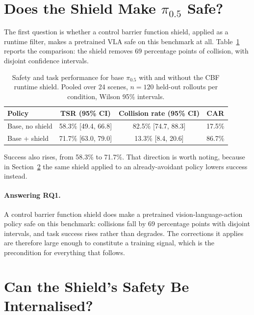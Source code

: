 \section{Does the Shield Make \texorpdfstring{$\pi_{0.5}$}{pi 0.5} Safe?}\label{sec:shield_efficacy}

The first question is whether a control barrier function shield, applied as a runtime filter, makes
a pretrained VLA safe on this benchmark at all. Table~\ref{tab:shield_efficacy} reports the
comparison: the shield removes 69 percentage points of collision, with disjoint confidence
intervals.

\begin{table}[htbp]
\centering
\caption{Safety and task performance for base $\pi_{0.5}$ with and without the CBF runtime shield.
  Pooled over 24 scenes, $n = 120$ held-out rollouts per condition, Wilson 95\% intervals.}
\label{tab:shield_efficacy}
\begin{tabular}{lccc}
\toprule
\textbf{Policy} & \textbf{TSR (95\% CI)} & \textbf{Collision rate (95\% CI)} & \textbf{CAR} \\
\midrule
Base, no shield & 58.3\% [49.4, 66.8] & 82.5\% [74.7, 88.3] & 17.5\% \\
Base + shield   & 71.7\% [63.0, 79.0] & 13.3\% [\phantom{0}8.4, 20.6] & 86.7\% \\
\bottomrule
\end{tabular}
\end{table}

Success also rises, from 58.3\% to 71.7\%. That direction is worth noting, because in
Section~\ref{sec:res:internalise} the same shield applied to an already-avoidant policy lowers
success instead.

\paragraph{Answering RQ1.}
A control barrier function shield does make a pretrained vision-language-action policy safe on this
benchmark: collisions fall by 69 percentage points with disjoint intervals, and task success rises
rather than degrades. The corrections it applies are therefore large enough to constitute a
training signal, which is the precondition for everything that follows.

\section{Can the Shield's Safety Be Internalised?}\label{sec:res:internalise}

